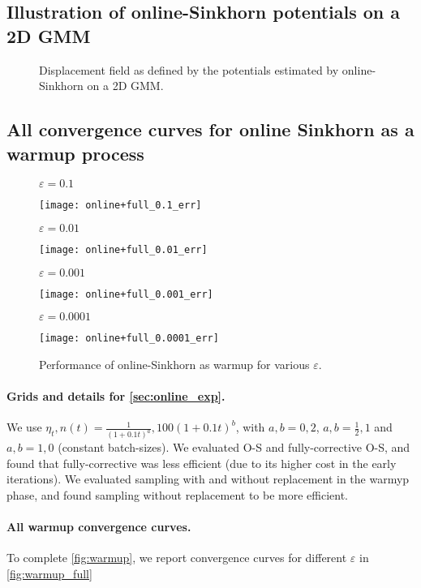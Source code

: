 \subsection{Illustration of online-Sinkhorn potentials on a 2D GMM}

\begin{figure}[htbp]
    \centering
    
    \caption{Displacement field as defined by the potentials estimated by online-Sinkhorn on a 2D GMM.}
    \label{fig:potentials_2d}
\end{figure}


\subsection{All convergence curves for online Sinkhorn as a warmup process}\label{app:online_exp}


\begin{figure}[t]
    \centering
    $\varepsilon = 0.1$

    \texttt{[image: online+full\_0.1\_err]}
    
    $\varepsilon = 0.01$

    \texttt{[image: online+full\_0.01\_err]}

    $\varepsilon = 0.001$

    \texttt{[image: online+full\_0.001\_err]}

    $\varepsilon = 0.0001$

    \texttt{[image: online+full\_0.0001\_err]}
    \caption{Performance of online-Sinkhorn as warmup for various $\varepsilon$.}
    \label{fig:warmup_full}
\end{figure}

\paragraph{Grids and details for \autoref{sec:online_exp}.} We use $\eta_t, n(t)
= \frac{1}{(1 + 0.1t)^a}, 100 (1 + 0.1t)^{b}$, with $a, b = 0, 2$, $a, b =
\frac{1}{2}, 1$ and $a,b =1, 0$ (constant batch-sizes). We evaluated O-S and
fully-corrective O-S, and found that fully-corrective was less efficient (due to
its higher cost in the early iterations). We evaluated sampling with and without
replacement in the warmyp phase, and found sampling without replacement to be
more efficient.

\paragraph{All warmup convergence curves.} To complete \autoref{fig:warmup}, we report convergence curves for different $\varepsilon$ in \autoref{fig:warmup_full}


